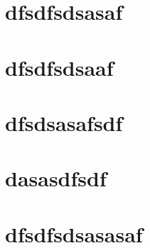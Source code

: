 \chapter{dfsdfsdsasaf}
\chapter{dfsdfsdsaaf}
\chapter{dfsdsasafsdf}
\chapter{dasasdfsdf}
\chapter{dfsdfsdsasasaf}

